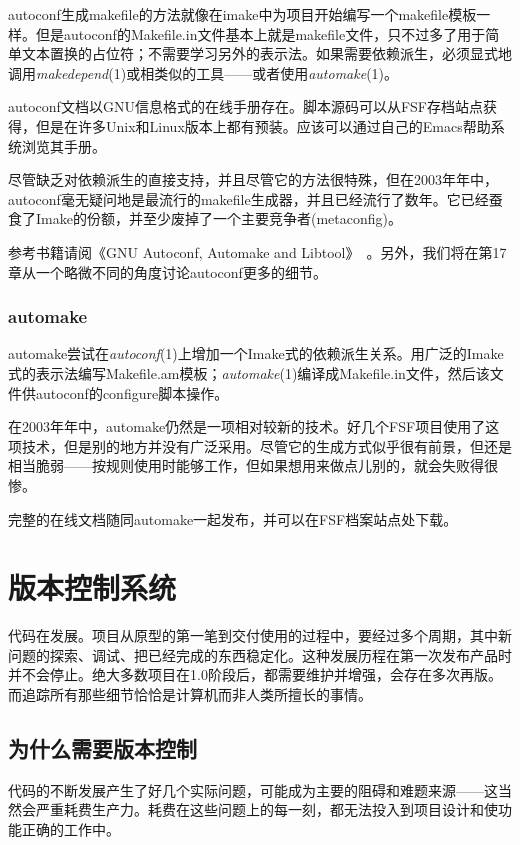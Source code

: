 \documentclass[12pt,oneside]{ctexbook}
\begin{document}
\begin{common-format}
autoconf生成makefile的方法就像在imake中为项目开始编写一个makefile模板一样。但是autoconf的Makefile.in文件基本上就是makefile文件，只不过多了用于简单文本置换的占位符；不需要学习另外的表示法。如果需要依赖派生，必须显式地调用\textit{makedepend}(1)或相类似的工具——或者使用\textit{automake}(1)。

autoconf文档以GNU信息格式的在线手册存在。脚本源码可以从FSF存档站点获得，但是在许多Unix和Linux版本上都有预装。应该可以通过自己的Emacs帮助系统浏览其手册。

尽管缺乏对依赖派生的直接支持，并且尽管它的方法很特殊，但在2003年年中，autoconf毫无疑问地是最流行的makefile生成器，并且已经流行了数年。它已经蚕食了Imake的份额，并至少废掉了一个主要竞争者(metaconfig)。

参考书籍请阅《GNU Autoconf, Automake and Libtool》~\cite{Vaughan}。另外，我们将在第17章从一个略微不同的角度讨论autoconf更多的细节。

\subsubsection{automake}
automake尝试在\textit{autoconf}(1)上增加一个Imake式的依赖派生关系。用广泛的Imake式的表示法编写Makefile.am模板；\textit{automake}(1)编译成Makefile.in文件，然后该文件供autoconf的configure脚本操作。

在2003年年中，automake仍然是一项相对较新的技术。好几个FSF项目使用了这项技术，但是别的地方并没有广泛采用。尽管它的生成方式似乎很有前景，但还是相当脆弱——按规则使用时能够工作，但如果想用来做点儿别的，就会失败得很惨。

完整的在线文档随同automake一起发布，并可以在FSF档案站点处下载。

\section{版本控制系统}
代码在发展。项目从原型的第一笔到交付使用的过程中，要经过多个周期，其中新问题的探索、调试、把已经完成的东西稳定化。这种发展历程在第一次发布产品时并不会停止。绝大多数项目在1.0阶段后，都需要维护并增强，会存在多次再版。而追踪所有那些细节恰恰是计算机而非人类所擅长的事情。

\subsection{为什么需要版本控制}
代码的不断发展产生了好几个实际问题，可能成为主要的阻碍和难题来源——这当然会严重耗费生产力。耗费在这些问题上的每一刻，都无法投入到项目设计和使功能正确的工作中。


\end{common-format}
\end{document}
